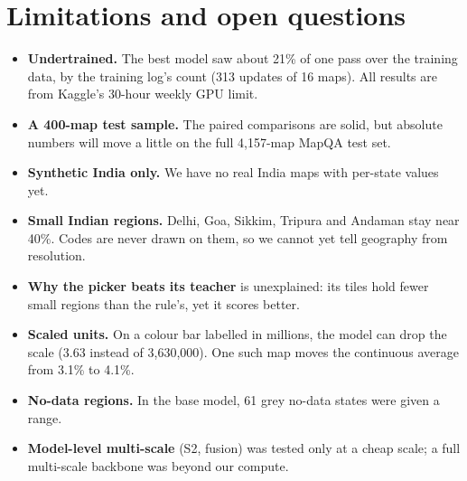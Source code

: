 \documentclass[11pt,a4paper]{article}
\begin{document}
\section{Limitations and open questions}
\begin{itemize}
\item \textbf{Undertrained.} The best model saw about 21\% of one pass over the training data, by the training log's count (313 updates of 16 maps). All results are from Kaggle's 30-hour weekly GPU limit.
\item \textbf{A 400-map test sample.} The paired comparisons are solid, but absolute numbers will move a little on the full 4,157-map MapQA test set.
\item \textbf{Synthetic India only.} We have no real India maps with per-state values yet.
\item \textbf{Small Indian regions.} Delhi, Goa, Sikkim, Tripura and Andaman stay near 40\%. Codes are never drawn on them, so we cannot yet tell geography from resolution.
\item \textbf{Why the picker beats its teacher} is unexplained: its tiles hold fewer small regions than the rule's, yet it scores better.
\item \textbf{Scaled units.} On a colour bar labelled in millions, the model can drop the scale (3.63 instead of 3,630,000). One such map moves the continuous average from 3.1\% to 4.1\%.
\item \textbf{No-data regions.} In the base model, 61 grey no-data states were given a range.
\item \textbf{Model-level multi-scale} (S2, fusion) was tested only at a cheap scale; a full multi-scale backbone was beyond our compute.
\end{itemize}
\end{document}
